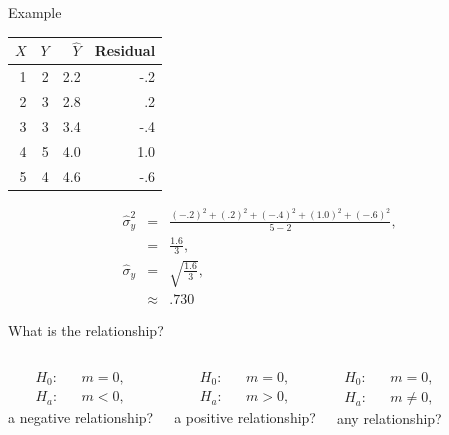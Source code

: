 \begin{frame}{Example}

  \begin{tabular}{r|r|r|r}
    $X$ & $Y$ & $\hat{Y}$ & Residual \\ \hline
    1 & 2 & 2.2 & -.2 \\
    2 & 3 & 2.8 &  .2 \\
    3 & 3 & 3.4 & -.4 \\
    4 & 5 & 4.0 & 1.0  \\
    5 & 4 & 4.6 & -.6
  \end{tabular}

  \begin{eqnarray*}
    \hat{\sigma}^2_y & = & \frac{ (-.2)^2 + (.2)^2 + (-.4)^2 + (1.0)^2 + (-.6)^2}{5-2}, \\
    & = & \frac{1.6}{3}, \\
    \hat{\sigma}_y & = & \sqrt{\frac{1.6}{3}}, \\
    & \approx & .730
  \end{eqnarray*}
  
\end{frame}
  

\begin{frame}{What is the relationship?}


    \begin{columns}

      \begin{eqnarray*}
        H_0: & & m=0, \\
        H_a: & & m<0,
      \end{eqnarray*}
      a negative relationship?


      \begin{eqnarray*}
        H_0: & & m=0, \\
        H_a: & & m>0,
      \end{eqnarray*}
      a positive relationship?



      \begin{eqnarray*}
        H_0: & & m=0, \\
        H_a: & & m\neq 0,
      \end{eqnarray*}
      any relationship?

      
    \end{columns}

  
\end{frame}





